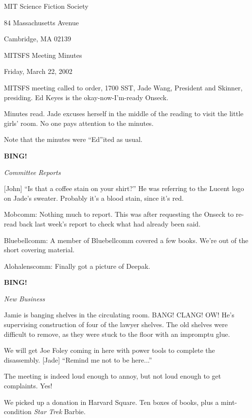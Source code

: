 \documentclass[12pt]{article}
\newcommand{\bing}{{\bf BING!} }
\newcommand{\goto}[1]{\bing \vskip 12pt \centerline{{\em{#1}}}}
\begin{document}
\begin{center}

MIT Science Fiction Society 

84 Massachusetts Avenue

Cambridge, MA 02139

\vspace{12pt}

MITSFS Meeting Minutes 

Friday, March 22, 2002

\end{center}
 
\vspace{18pt}

\setlength{\parskip}{6pt}

\noindent
MITSFS meeting called to order, 1700 SST, Jade Wang, President and
Skinner, presiding.  Ed Keyes is the okay-now-I'm-ready Onseck.

Minutes read.  Jade excuses herself in the middle of the reading to
visit the little girls' room.  No one pays attention to the minutes.

Note that the minutes were ``Ed''ited as usual.

\goto{Committee Reports}

[John] ``Is that a coffee stain on your shirt?''  He was referring
to the Lucent logo on Jade's sweater.  Probably it's a blood stain,
since it's red.

Mobcomm: Nothing much to report.  This was after requesting the
Onseck to re-read back last week's report to check what had already
been said.

Bluebellcomm: A member of Bluebellcomm covered a few books.  We're
out of the short covering material.

Alohalenscomm: Finally got a picture of Deepak.

\goto{New Business}

Jamie is banging shelves in the circulating room.  BANG!  CLANG!  OW!
He's supervising construction of four of the lawyer shelves.  The old
shelves were difficult to remove, as they were stuck to the floor
with an impromptu glue.

We will get Joe Foley coming in here with power tools to complete
the disassembly.  [Jade] ``Remind me not to be here...''

The meeting is indeed loud enough to annoy, but not loud enough to
get complaints.  Yes!

We picked up a donation in Harvard Square.  Ten boxes of books, plus
a mint-condition {\em Star Trek} Barbie.
\end{document}
